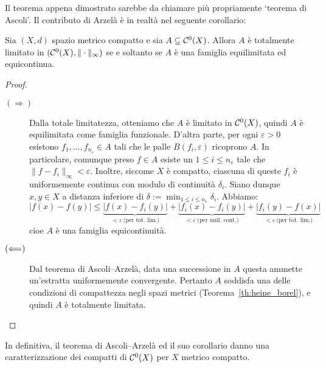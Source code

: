 Il teorema appena dimostrato sarebbe da chiamare più propriamente `teorema di Ascoli'. Il contributo di Arzelà è in realtà nel seguente corollario:

\begin{corollary}%
	Sia $(X,d)$ spazio metrico compatto e sia $A \subseteq \mathcal{C}^0(X)$.
	Allora $A$ è totalmente limitato in $(\mathcal{C}^0(X), \|\cdot\|_\infty)$ se e soltanto se $A$ è una famiglia equilimitata ed equicontinua.
\end{corollary}
\begin{proof}
	\leavevmode
	\begin{description}
		\item[$(\Longrightarrow)$] Dalla totale limitatezza, otteniamo che $A$ è limitato in $\mathcal{C}^0(X)$, quindi $A$ è equilimitata come famiglia funzionale.
		D'altra parte, per ogni $\varepsilon > 0$ esistono $f_1, \ldots, f_{n_\varepsilon} \in A$ tali che le palle $B(f_i, \varepsilon)$ ricoprono $A$. In particolare, comunque preso $f \in A$ esiste un $1 \leq i \leq n_\varepsilon$ tale che $\|f-f_i\|_\infty < \varepsilon$.
		Inoltre, siccome $X$ è compatto, ciascuna di queste $f_i$ è uniformemente continua con modulo di continuità $\delta_i$.
		Siano dunque $x, y \in X$ a distanza inferiore di $\delta := \min_{1 \leq i \leq n_\varepsilon} \delta_i$. Abbiamo:
		\begin{equation*}
			|f(x) - f(y)| \leq \underbrace{|f(x) - f_i(y)|}_{< \varepsilon\ \text{(per tot. lim.)}} + \underbrace{|f_i(x) - f_i(y)|}_{< \varepsilon\ \text{(per unif. cont.)}} + \underbrace{|f_i(y) - f(x)|}_{< \varepsilon\ \text{(per tot. lim.)}}
		\end{equation*}
		cioe $A$ è una famiglia equicontinuità.

		\item[$(\Longleftarrow)$] Dal teorema di Ascoli--Arzelà, data una successione in $A$ questa ammette un'estratta uniformemente convergente.
		Pertanto $A$ soddisfa una delle condizioni di compattezza negli spazi metrici (Teorema~\ref{th:heine_borel}), e quindi $A$ è totalmente limitata.
	\end{description}
\end{proof}

In definitiva, il teorema di Ascoli--Arzelà ed il suo corollario danno una caratterizzazione dei compatti di $\mathcal{C}^0(X)$ per $X$ metrico compatto.

